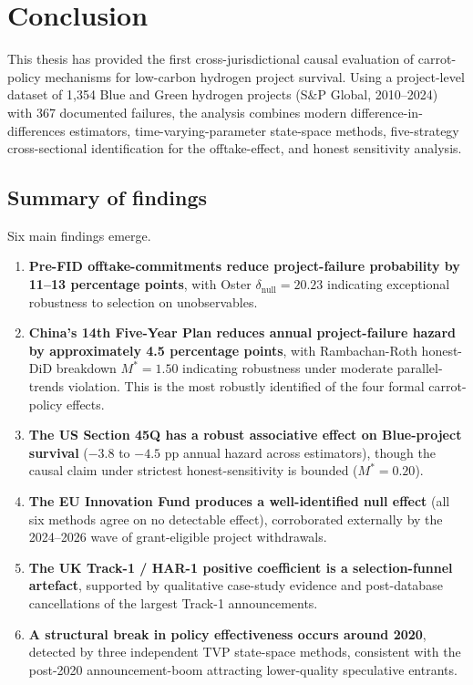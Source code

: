 \chapter{Conclusion}
\label{ch:conclusion}

This thesis has provided the first cross-jurisdictional causal evaluation of carrot-policy mechanisms for low-carbon hydrogen project survival. Using a project-level dataset of 1,354 Blue and Green hydrogen projects (S\&P Global, 2010--2024) with 367 documented failures, the analysis combines modern difference-in-differences estimators, time-varying-parameter state-space methods, five-strategy cross-sectional identification for the offtake-effect, and honest sensitivity analysis.

\section{Summary of findings}

Six main findings emerge.

\begin{enumerate}
\item \textbf{Pre-FID offtake-commitments reduce project-failure probability by 11--13 percentage points}, with Oster $\delta_{\text{null}} = 20.23$ indicating exceptional robustness to selection on unobservables.

\item \textbf{China's 14th Five-Year Plan reduces annual project-failure hazard by approximately 4.5 percentage points}, with Rambachan-Roth honest-DiD breakdown $M^* = 1.50$ indicating robustness under moderate parallel-trends violation. This is the most robustly identified of the four formal carrot-policy effects.

\item \textbf{The US Section 45Q has a robust associative effect on Blue-project survival} ($-3.8$ to $-4.5$ pp annual hazard across estimators), though the causal claim under strictest honest-sensitivity is bounded ($M^* = 0.20$).

\item \textbf{The EU Innovation Fund produces a well-identified null effect} (all six methods agree on no detectable effect), corroborated externally by the 2024--2026 wave of grant-eligible project withdrawals.

\item \textbf{The UK Track-1 / HAR-1 positive coefficient is a selection-funnel artefact}, supported by qualitative case-study evidence and post-database cancellations of the largest Track-1 announcements.

\item \textbf{A structural break in policy effectiveness occurs around 2020}, detected by three independent TVP state-space methods, consistent with the post-2020 announcement-boom attracting lower-quality speculative entrants.
\end{enumerate}

